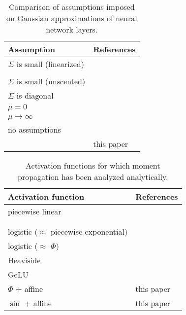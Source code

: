 \documentclass{article}
\begin{document}
\begin{table}[h]
    \begin{center}
      \begin{tabular}{ll}
      \toprule
      Assumption & References \\
      \midrule
      \(\Sigma\) is small (linearized)  & \citet{titensky_uncertainty_2018, nagel_kalman-bucy-informed_2022}\\
      & \citet{petersen_uncertainty_2024, jungmann_analytical_2025} \\
      \(\Sigma\) is small (unscented) & \citet{astudillo_propagation_2011, abdelaziz_uncertainty_2015} \\
      \(\Sigma\) is diagonal          &  \citet{huber_bayesian_2020, wagner_kalman_2022,akgul_deterministic_2025}\\
      \(\mu = 0\)    & \citet{bibi_analytic_2018} \\
      \(\mu \to \infty\) & \citet{wu_deterministic_2019} \\
      no assumptions                 &  \citet{wright_analytic_2024}\\
      & this paper \\
      \bottomrule
      \end{tabular}
    \end{center}
    
    \caption{\label{tab:covariance-assumptions} Comparison of assumptions imposed on Gaussian approximations of neural network layers.}
\end{table}

\begin{table}[h]
    \begin{center}
      \begin{tabular}{ll}
      \toprule
      Activation function & References \\
      \midrule
      piecewise linear & \citet{bibi_analytic_2018,huber_bayesian_2020}\\
      & \citet{wright_analytic_2024,akgul_deterministic_2025} \\
      & \citet{wu_deterministic_2019} \\
      logistic (\(\approx\) piecewise exponential) &  \citet{astudillo_propagation_2011,abdelaziz_uncertainty_2015}\\
      logistic (\(\approx\) \(\Phi\)) & \citet{huber_bayesian_2020} \\
      Heaviside &  \citet{wu_deterministic_2019, wright_analytic_2024}\\
      GeLU & \citet{wright_analytic_2024}\\
      \(\Phi\) + affine & this paper \\
      \(\sin\) + affine & this paper
      \\      
      \bottomrule
      \end{tabular}
    \end{center}
    \caption{\label{tab:activation-functions} Activation functions for which moment propagation has been analyzed analytically.}
\end{table}
\end{document}
